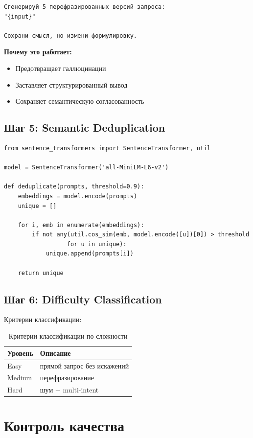 \documentclass[12pt,a4paper]{article}
\begin{document}
\begin{verbatim}
Сгенерируй 5 перефразированных версий запроса:
"{input}"

Сохрани смысл, но измени формулировку.
\end{verbatim}

\textbf{Почему это работает:}
\begin{itemize}
    \item Предотвращает галлюцинации
    \item Заставляет структурированный вывод
    \item Сохраняет семантическую согласованность
\end{itemize}

\subsection{Шаг 5: Semantic Deduplication}
\begin{verbatim}
from sentence_transformers import SentenceTransformer, util

model = SentenceTransformer('all-MiniLM-L6-v2')

def deduplicate(prompts, threshold=0.9):
    embeddings = model.encode(prompts)
    unique = []
    
    for i, emb in enumerate(embeddings):
        if not any(util.cos_sim(emb, model.encode([u])[0]) > threshold 
                  for u in unique):
            unique.append(prompts[i])
    
    return unique
\end{verbatim}

\subsection{Шаг 6: Difficulty Classification}
Критерии классификации:

\begin{table}[h]
\centering
\begin{tabular}{@{}ll@{}}
\toprule
Уровень & Описание \\
\midrule
Easy & прямой запрос без искажений \\
Medium & перефразирование \\
Hard & шум + multi-intent \\
\bottomrule
\end{tabular}
\caption{Критерии классификации по сложности}
\end{table}

\section{Контроль качества}
\end{document}

